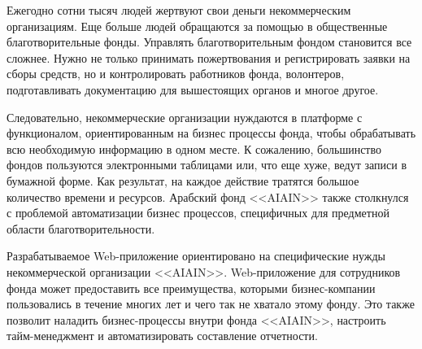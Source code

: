 Ежегодно сотни тысяч людей жертвуют свои деньги некоммерческим организациям. Еще больше людей обращаются за помощью в общественные благотворительные фонды. Управлять благотворительным фондом становится все сложнее. Нужно не только принимать пожертвования и регистрировать заявки на сборы средств, но и контролировать работников фонда, волонтеров, подготавливать документацию для вышестоящих органов и многое другое. 

Следовательно, некоммерческие организации нуждаются в платформе с функционалом, ориентированным на бизнес процессы фонда, чтобы обрабатывать всю необходимую информацию в одном месте. К сожалению, большинство фондов пользуются электронными таблицами или, что еще хуже, ведут записи в бумажной форме. Как результат, на каждое действие тратятся большое количество времени и ресурсов. Арабский фонд <<AIAIN>> также столкнулся с проблемой автоматизации бизнес процессов, специфичных для предметной области благотворительности. 


Разрабатываемое Web-приложение ориентировано на специфические нужды некоммерческой организации <<AIAIN>>. Web-приложение для сотрудников фонда может предоставить все преимущества, которыми бизнес-компании пользовались в течение многих лет и чего так не хватало этому фонду. Это также позволит наладить бизнес-процессы внутри фонда <<AIAIN>>, настроить тайм-менеджмент и автоматизировать составление отчетности.